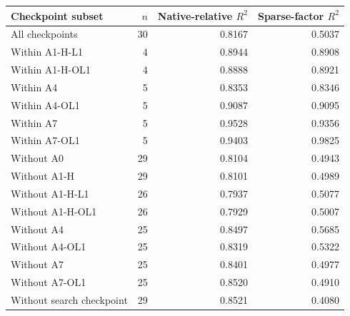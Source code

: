 \begin{tabular}{@{}lrrr@{}}
\toprule
Checkpoint subset & $n$ & Native-relative $R^2$ & Sparse-factor $R^2$ \\
\midrule
All checkpoints & 30 & 0.8167 & 0.5037 \\
Within A1-H-L1 & 4 & 0.8944 & 0.8908 \\
Within A1-H-OL1 & 4 & 0.8888 & 0.8921 \\
Within A4 & 5 & 0.8353 & 0.8346 \\
Within A4-OL1 & 5 & 0.9087 & 0.9095 \\
Within A7 & 5 & 0.9528 & 0.9356 \\
Within A7-OL1 & 5 & 0.9403 & 0.9825 \\
Without A0 & 29 & 0.8104 & 0.4943 \\
Without A1-H & 29 & 0.8101 & 0.4989 \\
Without A1-H-L1 & 26 & 0.7937 & 0.5077 \\
Without A1-H-OL1 & 26 & 0.7929 & 0.5007 \\
Without A4 & 25 & 0.8497 & 0.5685 \\
Without A4-OL1 & 25 & 0.8319 & 0.5322 \\
Without A7 & 25 & 0.8401 & 0.4977 \\
Without A7-OL1 & 25 & 0.8520 & 0.4910 \\
Without search checkpoint & 29 & 0.8521 & 0.4080 \\
\bottomrule
\end{tabular}
